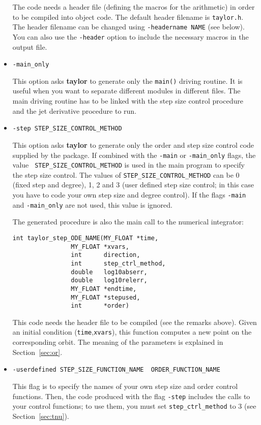 \documentclass{article}
\begin{document}
\begin{itemize}
{The code needs a header
file (defining the macros for the arithmetic)
in order to be compiled into object code. The default header
filename is {\tt taylor.h}.  The header filename can be changed
using {\verb+-headername NAME+} (see below).
You can also use the {\verb+-header+} option to include the necessary
macros in the output file.}

\item{\verb+-main_only+

This option asks {\bf taylor} to generate only
the \verb+main()+ driving routine. It is useful
when you want to separate different modules in
different files. The main driving routine has
to be linked with the step size control procedure
and the jet derivative procedure to run.
}

\item{\verb+-step STEP_SIZE_CONTROL_METHOD+

This option asks {\bf taylor} to generate only the order and step size
control code supplied by the package. If combined with the {\tt -main}
or {\tt -main\_only} flags, the value {\tt
STEP\_SIZE\_CONTROL\_METHOD} is used in the main program to specify
the step size control. The values of {\tt STEP\_SIZE\_CONTROL\_METHOD}
can be 0 (fixed step and degree), 1, 2 and 3 (user defined step size
control; in this case you have to code your own step size and degree
control). If the flags {\tt -main} and {\tt -main\_only} are not used,
this value is ignored.

The generated procedure is also the main call to the numerical
integrator:
\begin{verbatim}
int taylor_step_ODE_NAME(MY_FLOAT *time,
                MY_FLOAT *xvars,
                int      direction,
                int      step_ctrl_method,
                double   log10abserr,
                double   log10relerr,
                MY_FLOAT *endtime,
                MY_FLOAT *stepused,
                int      *order)
\end{verbatim}
This code needs the header file to be compiled (see the remarks
above). Given an initial condition ({\tt time},{\tt xvars}), this
function computes a new point on the corresponding orbit. The meaning
of the parameters is explained in Section~\ref{sec:or}.
}

\item{\verb+-userdefined STEP_SIZE_FUNCTION_NAME  ORDER_FUNCTION_NAME+

This flag is to specify the names of your own step size and order
control functions. Then, the code produced with the flag {\tt -step}
includes the calls to your control functions; to use them, you
must set {\tt step\_ctrl\_method} to 3 (see Section~\ref{sec:tnu}).

}
\end{itemize}
\end{document}
